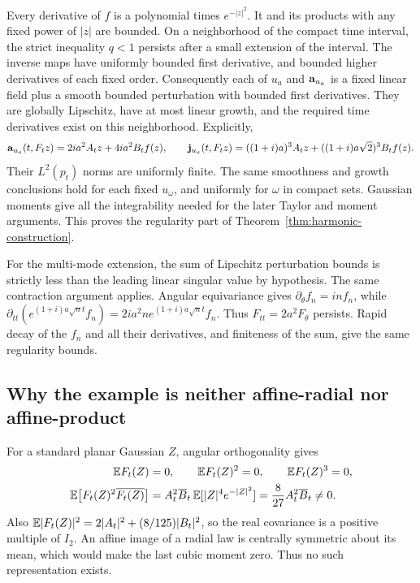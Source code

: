 Every derivative of $f$ is a polynomial times $e^{-|z|^2}$. It and its
products with any fixed power of $|z|$ are bounded. On a neighborhood
of the compact time interval, the strict inequality $q<1$ persists
after a small extension of the interval. The inverse maps have uniformly
bounded first derivative, and bounded higher derivatives of each fixed
order. Consequently each of $u_a$ and $\mathbf a_{u_a}$ is a fixed linear
field plus a smooth bounded perturbation with bounded first derivatives.
They are globally Lipschitz, have at most linear growth, and the required
time derivatives exist on this neighborhood. Explicitly,
\[
 \mathbf a_{u_a}(t,F_tz)=2ia^2A_tz+4ia^2B_tf(z),\qquad
 \mathbf j_{u_a}(t,F_tz)
 =((1+i)a)^3A_tz+((1+i)a\sqrt2)^3B_tf(z).
\]
Their $L^2(p_t)$ norms are uniformly finite. The same smoothness and
growth conclusions hold for each fixed $u_\omega$, and uniformly for
$\omega$ in compact sets. Gaussian moments give all the integrability
needed for the later Taylor and moment arguments. This proves the
regularity part of Theorem~\ref{thm:harmonic-construction}.

For the multi-mode extension, the sum of Lipschitz perturbation bounds
is strictly less than the leading linear singular value by hypothesis.
The same contraction argument applies. Angular equivariance gives
$\partial_\theta f_n=in f_n$, while
$\partial_{tt}(e^{(1+i)a\sqrt n t}f_n)=2ia^2n
e^{(1+i)a\sqrt n t}f_n$. Thus
$F_{tt}=2a^2F_\theta$ persists. Rapid decay of the $f_n$ and all their
derivatives, and finiteness of the sum, give the same regularity bounds.

\subsection{Why the example is neither affine-radial nor affine-product}

For a standard planar Gaussian $Z$, angular orthogonality gives
\begin{align}
 \mathbb E F_t(Z)&=0,\qquad \mathbb E F_t(Z)^2=0,\qquad \mathbb E F_t(Z)^3=0,
 \label{eq:harmonic-oddmoments}\\
 \mathbb E\bigl[F_t(Z)^2\overline{F_t(Z)}\bigr]
 &=A_t^2\overline B_t\,\mathbb E[|Z|^4e^{-|Z|^2}]
 =\frac8{27}A_t^2\overline B_t\ne0.\nonumber
\end{align}
Also $\mathbb E|F_t(Z)|^2=2|A_t|^2+(8/125)|B_t|^2$, so the real covariance
is a positive multiple of $I_2$. An affine image of a radial law is
centrally symmetric about its mean, which would make the last cubic
moment zero. Thus no such representation exists.

